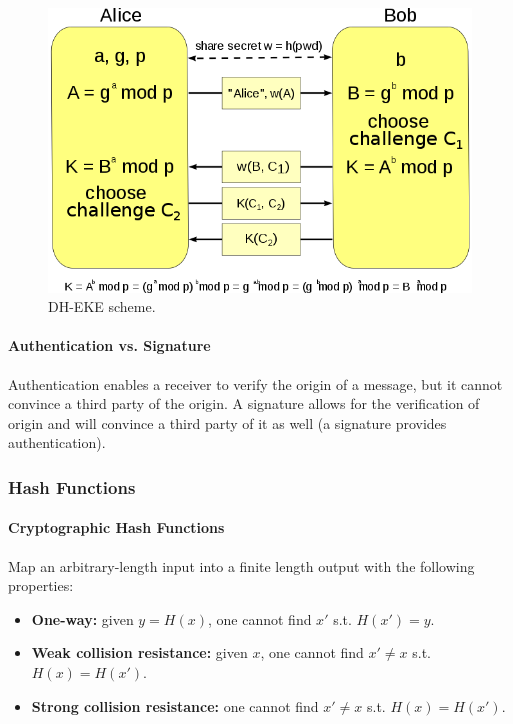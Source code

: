 \begin{figure}[h]
	\centering
	\includegraphics[scale=0.3]{images/1-dh_eke.png}
	\caption{DH-EKE scheme.}
	\label{fig:dh_eke}
\end{figure}

\paragraph{Authentication vs. Signature}
Authentication enables a receiver to verify the origin of a message, but it cannot convince a third party of the origin. A signature allows for the verification of origin and will convince a third party of it as well (a signature provides authentication).

\subsubsection{Hash Functions}

\paragraph{Cryptographic Hash Functions}
Map an arbitrary-length input into a finite length output with the following properties:

\begin{itemize}
    \item \textbf{One-way:} given $y = H(x)$, one cannot find $x'$ s.t. $H(x') = y$.
    \item \textbf{Weak collision resistance:} given $x$, one cannot find $x' \neq x$ s.t. $H(x) = H(x')$.
    \item \textbf{Strong collision resistance:} one cannot find $x' \neq x$ s.t. $H(x) = H(x')$.
\end{itemize}

